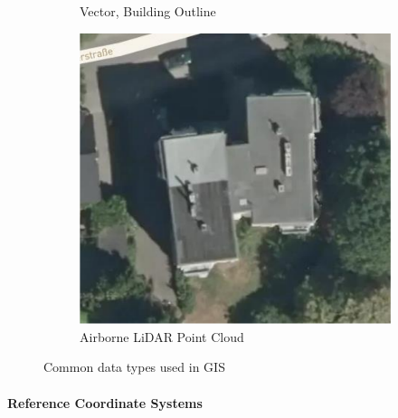 \begin{figure}[!htb]
\begin{subfigure}[t]{.30\linewidth}
    \caption{\label{fig:ch1_gis_type_b}Vector, Building Outline}
  \end{subfigure}
  \begin{subfigure}[t]{.30\linewidth}
    \centering\includegraphics[page=3,clip,trim=0cm 0cm 0cm 0cm,width=.99\linewidth]{chapter_1_intro/imgs/gis_types.pdf}
    \caption{\label{fig:ch1_gis_type_c}Airborne LiDAR Point Cloud}
  \end{subfigure}
  \caption[Common data types used in GIS]{Common data types used in \ac{GIS}}\label{fig:ch1_gis_types}
\end{figure}

\paragraph{Reference Coordinate Systems}


